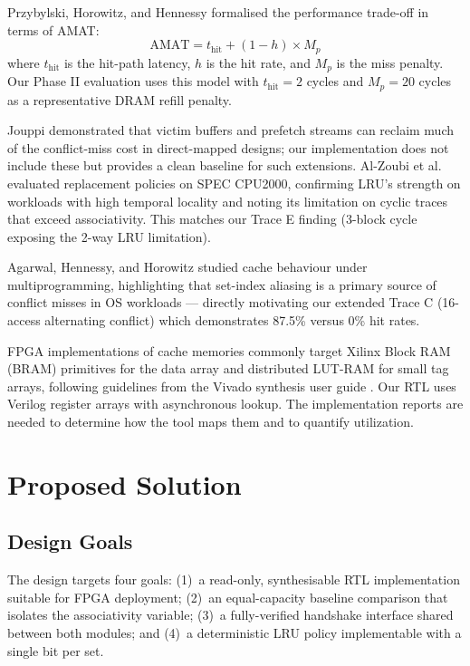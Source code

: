 \documentclass[conference]{IEEEtran}
\begin{document}
Przybylski, Horowitz, and Hennessy \cite{przybylski1988} formalised the
performance trade-off in terms of AMAT:
\begin{equation}
  \text{AMAT} = t_{\text{hit}} + (1 - h) \times M_p
  \label{eq:amat}
\end{equation}
where $t_{\text{hit}}$ is the hit-path latency, $h$ is the hit rate, and
$M_p$ is the miss penalty.
Our Phase II evaluation uses this model with $t_{\text{hit}} = 2$ cycles
and $M_p = 20$ cycles as a representative DRAM refill penalty.

Jouppi \cite{jouppi1990} demonstrated that victim buffers and prefetch
streams can reclaim much of the conflict-miss cost in direct-mapped
designs; our implementation does not include these but provides a clean
baseline for such extensions.
Al-Zoubi et al.\ \cite{al-zoubi2004} evaluated replacement policies on
SPEC CPU2000, confirming LRU's strength on workloads with high temporal
locality and noting its limitation on cyclic traces that exceed associativity.
This matches our Trace E finding (3-block cycle exposing the 2-way LRU
limitation).

Agarwal, Hennessy, and Horowitz \cite{agarwal1989} studied cache behaviour
under multiprogramming, highlighting that set-index aliasing is a primary
source of conflict misses in OS workloads — directly motivating our
extended Trace C (16-access alternating conflict) which demonstrates 87.5\%
versus 0\% hit rates.

FPGA implementations of cache memories commonly target Xilinx Block RAM
(BRAM) primitives for the data array and distributed LUT-RAM for small
tag arrays, following guidelines from the Vivado synthesis user guide
\cite{vivado2023}.
Our RTL uses Verilog register arrays with asynchronous lookup. The
implementation reports are needed to determine how the tool maps them
and to quantify utilization.

\section{Proposed Solution}
\label{sec:solution}

\subsection{Design Goals}
\label{subsec:goals}

The design targets four goals: (1)~a read-only, synthesisable RTL
implementation suitable for FPGA deployment; (2)~an equal-capacity
baseline comparison that isolates the associativity variable;
(3)~a fully-verified handshake interface shared between both modules; and
(4)~a deterministic LRU policy implementable with a single bit per set.
\end{document}
